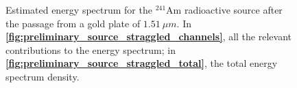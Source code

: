 \documentclass[../../main/main.tex]{subfiles}
\begin{document}
\begin{figure}[h]
    \centering
    \begin{minipage}[c]{0.49\linewidth}
        \vspace{0pt}
        \centering
    \end{minipage}%
    \hfill%
    \begin{minipage}[c]{0.49\linewidth}
        \vspace{0pt}
        \centering
    \end{minipage}%
    \caption{Estimated energy spectrum for the ${}^{241}\mathrm{Am}$ radioactive source after the passage from a gold plate of \( 1.51 \ \si{\mu m} \). In \textbf{\ref{fig:preliminary_source_straggled_channels}}, all the relevant contributions to the energy spectrum; in \textbf{\ref{fig:preliminary_source_straggled_total}}, the total energy spectrum density.}
    \label{fig:preliminary_source_straggled}
\end{figure}
\end{document}
